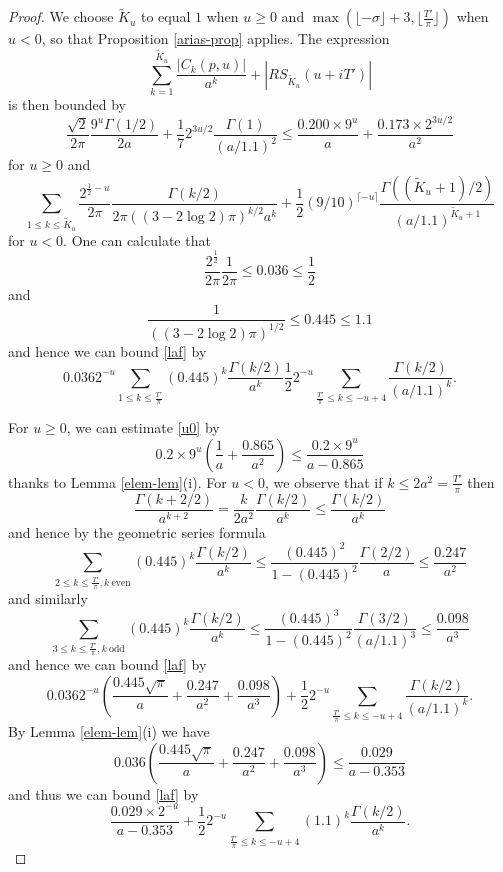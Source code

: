 \begin{proof}
We choose $\tilde K_u$ to equal $1$ when $u \geq 0$ and $\max( \lfloor -\sigma \rfloor + 3, \lfloor \frac{T'}{\pi} \rfloor )$ when $u < 0$, so that Proposition \ref{arias-prop} applies.  The expression
$$ \sum_{k=1}^{\tilde K_u} \frac{|C_k(p,u)|}{a^k} + |RS_{\tilde K_u}(u + iT')| $$
is then bounded by
\begin{equation}\label{u0}
 \frac{\sqrt{2}}{2\pi} \frac{9^u \Gamma(1/2)}{2a} + \frac{1}{7} 2^{3u/2} \frac{\Gamma(1)}{(a/1.1)^2}
\leq \frac{0.200 \times 9^u}{a} + \frac{0.173 \times 2^{3u/2}}{a^2} 
\end{equation}
for $u \geq 0$ and
\begin{equation}\label{laf}
 \sum_{1 \leq k \leq \tilde K_u} \frac{2^{\frac{1}{2}-u}}{2\pi} \frac{\Gamma(k/2)}{2\pi ((3-2\log 2)\pi)^{k/2} a^k} + \frac{1}{2} (9/10)^{\lceil -u \rceil} \frac{\Gamma((\tilde K_u + 1)/2)}{(a/1.1)^{\tilde K_u + 1}}
\end{equation}
for $u < 0$.  One can calculate that
$$ \frac{2^{\frac{1}{2}}}{2\pi} \frac{1}{2\pi} \leq 0.036 \leq \frac{1}{2}$$
and
$$ \frac{1}{((3-2\log 2)\pi)^{1/2}} \leq 0.445 \leq 1.1$$
and hence we can bound \eqref{laf} by
$$  0.036 2^{-u} \sum_{1 \leq k \leq \frac{T'}{\pi}} (0.445)^k \frac{\Gamma(k/2)}{a^k} 
\frac{1}{2} 2^{-u} \sum_{\frac{T'}{\pi} \leq k \leq -u+4} \frac{\Gamma(k/2)}{(a/1.1)^k}.$$

For $u \geq 0$, we can estimate \eqref{u0} by
$$ 0.2 \times 9^u \left(\frac{1}{a} + \frac{0.865}{a^2}\right) \leq \frac{0.2 \times 9^u}{a - 0.865}$$
thanks to Lemma \ref{elem-lem}(i).  For $u<0$, we observe that if $k \leq 2 a^2 = \frac{T'}{\pi}$ then
$$ \frac{\Gamma(k+2/2)}{a^{k+2}} = \frac{k}{2 a^2} \frac{\Gamma(k/2)}{a^k} \leq \frac{\Gamma(k/2)}{a^k}$$
and hence by the geometric series formula
$$ \sum_{2 \leq k \leq \frac{T'}{\pi}, k\ \mathrm{even}} (0.445)^k \frac{\Gamma(k/2)}{a^k}  \leq \frac{(0.445)^2}{1-(0.445)^2} \frac{\Gamma(2/2)}{a} \leq \frac{0.247}{a^2}$$
and similarly
$$ \sum_{3 \leq k \leq \frac{T'}{\pi}, k\ \mathrm{odd}} (0.445)^k \frac{\Gamma(k/2)}{a^k}  \leq \frac{(0.445)^3}{1-(0.445)^2} \frac{\Gamma(3/2)}{(a/1.1)^3} \leq \frac{0.098}{a^3}$$
and hence we can bound \eqref{laf} by
$$ 0.036 2^{-u} \left(\frac{0.445 \sqrt{\pi}}{a} + \frac{0.247}{a^2} + \frac{0.098}{a^3}\right) + \frac{1}{2} 2^{-u}  \sum_{\frac{T'}{\pi} \leq k \leq -u+4} \frac{\Gamma(k/2)}{(a/1.1)^k}.$$
By Lemma \ref{elem-lem}(i) we have
$$ 0.036 \left(\frac{0.445 \sqrt{\pi}}{a} + \frac{0.247}{a^2} + \frac{0.098}{a^3}\right) \leq \frac{0.029}{a - 0.353}$$
and thus we can bound \eqref{laf} by
$$ \frac{0.029 \times 2^{-u}}{a - 0.353} + \frac{1}{2} 2^{-u} \sum_{\frac{T'}{\pi} \leq k \leq -u+4} (1.1)^{k} \frac{\Gamma(k/2)}{a^k}.$$


\end{proof}
